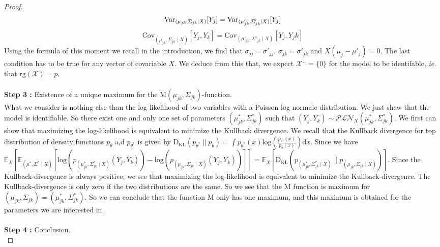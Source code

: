 \documentclass[11pt, a4paper]{article}
\begin{document}
\begin{proof}
\begin{equation}
 \mathrm{Var}_{(\mu_{jk},\Sigma_{jk} \mid X)}[Y_j]=\mathrm{Var}_{(\mu'_{jk},\Sigma'_{jk} \mid X)} [Y_j] \\
\end{equation}
\begin{equation}
 \mathrm{Cov}_{(\mu_{jk},\Sigma_{jk} \mid X)}[Y_j,Y_k]=\mathrm{Cov}_{(\mu'_{jk},\Sigma'_{jk} \mid X)} [Y_j,Y_jk]
\end{equation}
Using the formula of this moment we recall in the introduction, we find that $\sigma_{jj} = \sigma'_{jj}$, $\sigma_{jk}=\sigma'_{jk}$ and $X (\mu_j-\mu'_j)=0$. The last condition has to be true for any vector of covariable $X$. We deduce from this that,  we expect $\mathcal{X}^\perp = \{0\}$ for the model to be identifable, \textit{ie.} that $\mathrm{rg}(\mathcal{X})=p$.\\
\\
\textbf{Step 3 :} Existence of a unique maximum for the $\mathrm{M}(\mu_{jk},\Sigma_{jk})$-function.\\
What we consider is nothing else than the log-likelihood of two variables with a Poisson-log-normale distribution. We just shew that the model is identifiable. So there exist one and only one set of parameters $(\mu_{jk}^\ast, \Sigma_{jk}^\ast)$ such that $(Y_j,Y_k) \sim \mathcal{PLN}_X(\mu_{jk}^\ast,\Sigma_{jk}^\ast)$. We first can show that maximizing the log-likelihood is equivalent to minimize the Kullback divergence. We recall that the Kullback divergence for top distribution of density functions $p_\theta$ a,d $p_{\theta^\ast}$ is given by $\mathrm{D_{KL}}(p_{\theta^\ast} \parallel p_{\theta})= \int p_{\theta^\ast}(x) \mathrm{log}(\frac{p_{\theta^\ast}(x)}{p_{\theta}(x)}) \mathrm{d}x$. Since we have $\mathbb{E}_X[\mathbb{E}_{(\mu^\ast,\Sigma^\ast \mid X)}[\mathrm{log}(p_{(\mu_{jk}^\ast,\Sigma_{jk}^\ast \mid X)}(Y_j,Y_k)) - \mathrm{log}(p_{(\mu_{jk},\Sigma_{jk} \mid X)}(Y_j,Y_k))]] = \mathbb{E}_X[\mathrm{D_{KL}}(p_{(\mu_{jk}^\ast,\Sigma_{jk}^\ast \mid X)}\parallel p_{(\mu_{jk},\Sigma_{jk} \mid X)})]$. Since the Kullback-divergence is always positive, we see that maximizing the log-likelihood is equivalent to minimize the Kullback-divergence. The Kullback-divergence is only zero if the two distributions are the same. So we see that the M function is maximum for $(\mu_{jk},\Sigma_{jk})=(\mu_{jk}^\ast,\Sigma_{jk}^\ast)$. So we can conclude that the function M only has one maximum, and this maximum is obtained for the parameters we are interested in.\\
\\
\textbf{Step 4 :} Conclusion.\\

\end{proof}
\end{document}
